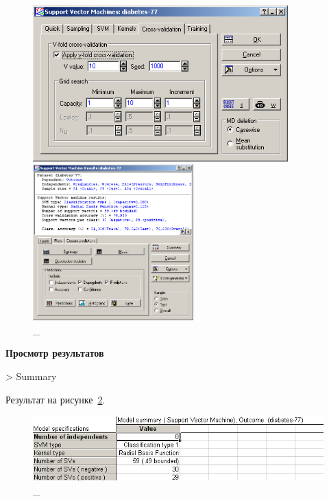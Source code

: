 \begin{figure}[!h]
  \centering

  \begin{minipage}{0.49\textwidth}
    \centering

    \includegraphics[height=6cm]
    {inc/v5_11.PNG}

    \caption{\_}

    \label{fig:v5_11}
  \end{minipage}
  \begin{minipage}{0.49\textwidth}
    \centering

    \includegraphics[height=6cm]
    {inc/v5_12.PNG}

    \caption{\_}

    \label{fig:v5_12}
  \end{minipage}
\end{figure}

\begin{center}
  \textbf{Просмотр результатов}
\end{center}

> Summary

Результат на рисунке~\ref{fig:v5_13}.

\begin{figure}[!h]
  \centering

  \includegraphics[height=2.5cm]
  {inc/v5_13.PNG}

  \caption{\_}

  \label{fig:v5_13}
\end{figure}

